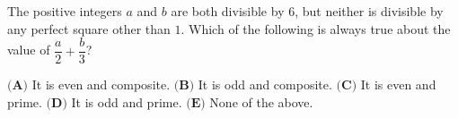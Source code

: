 The positive integers $a$ and $b$ are both divisible by $6$, but neither is divisible by any perfect square other than $1$. Which of the following is always true about the value of $\dfrac{a}{2}+\dfrac{b}{3}$?

$\textbf{(A)}$ It is even and composite. \quad
$\textbf{(B)}$ It is odd and composite. \quad
$\textbf{(C)}$ It is even and prime. \quad
$\textbf{(D)}$ It is odd and prime. \quad
$\textbf{(E)}$ None of the above.
